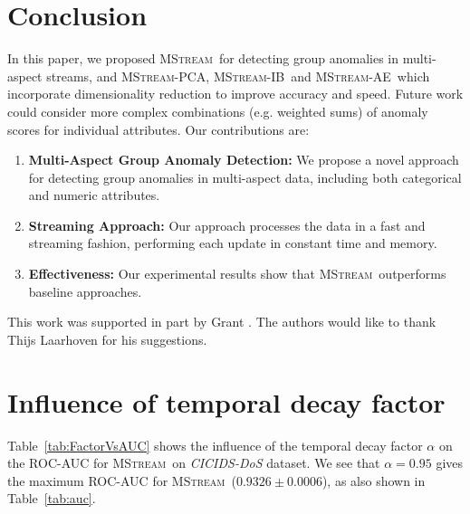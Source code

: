 \documentclass[sigconf]{acmart}
\newcommand{\method}{\textsc{MStream}}
\begin{document}
\iffalse
\subsection{Incorporating Correlation Between Features}
\label{sec:correlation}

Tables \ref{tab:auc} and \ref{tab:times} show the AUC and running time of \method, \method-PCA, \method-IB and \method-AE on the \emph{KDDCUP99}, \emph{CICIDS-DoS}, \emph{UNSW-NB 15} and \emph{CICIDS-DDoS} datasets. We observe that \method-AE outperforms \method, \method-PCA and \method-IB across all datasets while running faster than \method\ and having running time comparable to \method-PCA and \method-IB.
\fi \section{Conclusion}
In this paper, we proposed \method\ for detecting group anomalies in multi-aspect streams, and \method-PCA, \method-IB\ and \method-AE\ which incorporate dimensionality reduction to improve accuracy and speed. Future work could consider more complex combinations (e.g. weighted sums) of anomaly scores for individual attributes. Our contributions are:
\begin{enumerate}
    \item {\bf Multi-Aspect Group Anomaly Detection:} We propose a novel approach for detecting group anomalies in multi-aspect data, including both categorical and numeric attributes.
    \item {\bf Streaming Approach:} Our approach processes the data in a fast and streaming fashion, performing each update in constant time and memory.
    \item {\bf Effectiveness:} Our experimental results show that \method\ outperforms baseline approaches.
\end{enumerate}



%
 



\begin{acks}
This work was supported in part by  Grant . The authors would like to thank Thijs Laarhoven for his suggestions.
\end{acks}





\appendix


\section{Influence of temporal decay factor}
\label{app:3}
Table~\ref{tab:FactorVsAUC} shows the influence of the temporal decay factor $\alpha$ on the ROC-AUC for \method\ on \emph{CICIDS-DoS} dataset. We see that $\alpha=0.95$ gives the maximum ROC-AUC for \method\ ($0.9326 \pm 0.0006$), as also shown in Table~\ref{tab:auc}.
\end{document}
